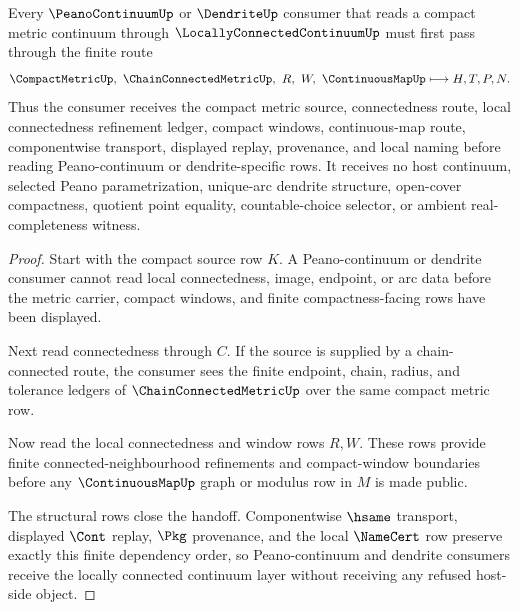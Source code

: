\begin{theorem}
\label{thm:locally-connected-continuum-peano-handoff}
Every $\PeanoContinuumUp$ or $\DendriteUp$ consumer that reads a compact metric continuum through $\LocallyConnectedContinuumUp$ must first pass through the finite route
$$
\CompactMetricUp,\ \ChainConnectedMetricUp,\ R,\ W,\ \ContinuousMapUp
\longmapsto
H,T,P,N .
$$
Thus the consumer receives the compact metric source, connectedness route, local connectedness refinement ledger, compact windows, continuous-map route, componentwise transport, displayed replay, provenance, and local naming before reading Peano-continuum or dendrite-specific rows. It receives no host continuum, selected Peano parametrization, unique-arc dendrite structure, open-cover compactness, quotient point equality, countable-choice selector, or ambient real-completeness witness.
\end{theorem}
\begin{proof}
Start with the compact source row $K$. A Peano-continuum or dendrite consumer cannot read local connectedness, image, endpoint, or arc data before the metric carrier, compact windows, and finite compactness-facing rows have been displayed.

Next read connectedness through $C$. If the source is supplied by a chain-connected route, the consumer sees the finite endpoint, chain, radius, and tolerance ledgers of $\ChainConnectedMetricUp$ over the same compact metric row.

Now read the local connectedness and window rows $R,W$. These rows provide finite connected-neighbourhood refinements and compact-window boundaries before any $\ContinuousMapUp$ graph or modulus row in $M$ is made public.

The structural rows close the handoff. Componentwise $\hsame$ transport, displayed $\Cont$ replay, $\Pkg$ provenance, and the local $\NameCert$ row preserve exactly this finite dependency order, so Peano-continuum and dendrite consumers receive the locally connected continuum layer without receiving any refused host-side object.
\end{proof}


